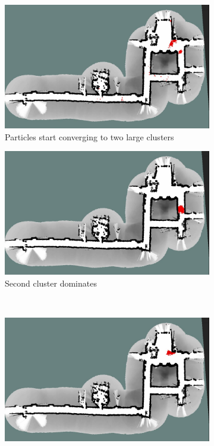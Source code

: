 \begin{figure}
\centering
\begin{subfigure}[b]{0.49\textwidth}
\includegraphics[width=\linewidth]{figures/Screenshot-video_log5-10k_goodenough-1}
\caption{Particles start converging to two large clusters}
\label{fig:Screenshot-video_log5-10k_goodenough-1}
\end{subfigure}
\begin{subfigure}[b]{0.49\textwidth}
\includegraphics[width=\linewidth]{figures/Screenshot-video_log5-10k_goodenough-2}
\caption{Second cluster dominates}
\label{fig:Screenshot-video_log5-10k_goodenough-2}
\end{subfigure}
\\
\begin{subfigure}[b]{0.49\textwidth}
\includegraphics[width=\linewidth]{figures/Screenshot-video_log5-10k_goodenough-3}

\end{subfigure}
\end{figure}
